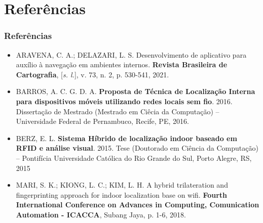 \documentclass[xcolor={dvipsnames,svgnames,table}]{beamer}
\begin{document}
	\section{Referências}
	\label{referencias}
	\begin{frame}
		\frametitle{Referências}
		\begin{itemize}[left=0pt]%
			\setlength\itemsep{5pt}
			\justifying
			
			\item {\footnotesize ARAVENA, C. A.; DELAZARI, L. S. Desenvolvimento de aplicativo para auxílio à navegação em ambientes internos. \textbf{Revista Brasileira de Cartografia}, [\textit{s. l.}], v. 73, n. 2, p. 530-541, 2021.}
			
			\item {\footnotesize BARROS, A. C. G. D. A. \textbf{Proposta de Técnica de Localização Interna para dispositivos móveis utilizando redes locais sem fio}. 2016. Dissertação de Mestrado (Mestrado em Ciêcia da Computação) – Universidade Federal de Pernambuco, Recife, PE, 2016.}
			
			\item {\footnotesize BERZ, E. L. \textbf{Sistema Híbrido de localização indoor baseado em RFID e análise visual}. 2015. Tese (Doutorado em Ciência da Computação) – Pontifícia Universidade Católica do Rio Grande do Sul, Porto Alegre, RS, 2015}
			
			\item {\footnotesize MARI, S. K.; KIONG, L. C.; KIM, L. H. A hybrid trilateration and fingerprinting approach for indoor localization base on wifi. \textbf{Fourth International Conference on Advances in Computing, Comunication Automation - ICACCA}, Subang Jaya, p. 1-6, 2018.}
			
		\end{itemize}
	\end{frame}
\end{document}
